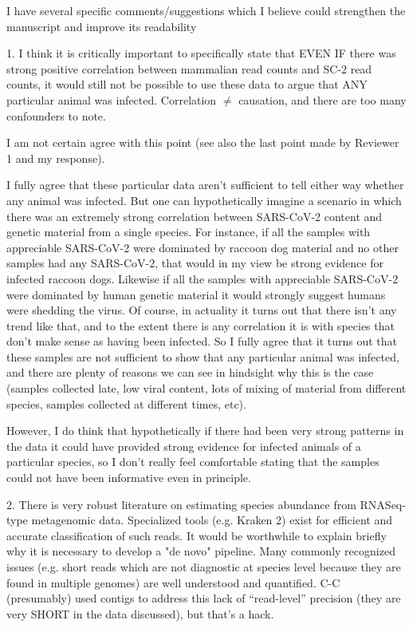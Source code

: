 \documentclass[11pt, oneside]{article}   	%
\newcommand{\response}[1]{{\color{black}#1}}
\begin{document}
I have several specific comments/suggestions which I believe could strengthen the manuscript and improve its readability

1. I think it is critically important to specifically state that EVEN IF there was strong positive correlation between mammalian read counts and SC-2 read counts, it would still not be possible to use these data to argue that ANY particular animal was infected. Correlation $\ne$ causation, and there are too many confounders to note.

\response{
I am not certain agree with this point (see also the last point made by Reviewer 1 and my response).

I fully agree that these particular data aren't sufficient to tell either way whether any animal was infected.
But one can hypothetically imagine a scenario in which there was an extremely strong correlation between SARS-CoV-2 content and genetic material from a single species.
For instance, if all the samples with appreciable SARS-CoV-2 were dominated by raccoon dog material and no other samples had any SARS-CoV-2, that would in my view be strong evidence for infected raccoon dogs.
Likewise if all the samples with appreciable SARS-CoV-2 were dominated by human genetic material it would strongly suggest humans were shedding the virus.
Of course, in actuality it turns out that there isn't any trend like that, and to the extent there is any correlation it is with species that don't make sense as having been infected.
So I fully agree that it turns out that these samples are not sufficient to show that any particular animal was infected, and there are plenty of reasons we can see in hindsight why this is the case (samples collected late, low viral content, lots of mixing of material from different species, samples collected at different times, etc).

However, I do think that hypothetically if there had been very strong patterns in the data it could have provided strong evidence for infected animals of a particular species, so I don't really feel comfortable stating that the samples could not have been informative even in principle.
}

2. There is very robust literature on estimating species abundance from RNASeq-type metagenomic data. Specialized tools (e.g. Kraken 2) exist for efficient and accurate classification of such reads. It would be worthwhile to explain briefly why it is necessary to develop a "de novo" pipeline. Many commonly recognized issues (e.g. short reads which are not diagnostic at species level because they are found in multiple genomes) are well understood and quantified. C-C (presumably) used contigs to address this lack of ``read-level'' precision (they are very SHORT in the data discussed), but that's a hack.
\end{document}
